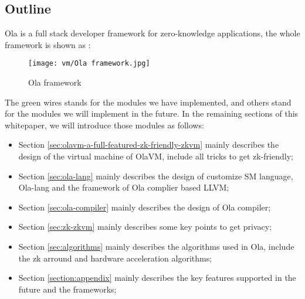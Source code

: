 \subsection{Outline}

Ola is a full stack developer framework for zero-knowledge applications, the whole framework is shown as :
\begin{figure}[!ht]
    \centering
    \texttt{[image: vm/Ola framework.jpg]}
    \caption{Ola framework}
    \label{fig:Ola framework}
\end{figure}

The green wires stands for the modules we have implemented, and others stand for the modules we will implement in the future. In the remaining sections of this whitepaper, we will introduce those modules 
as follows:
\begin{itemize}
    \item Section \ref{sec:olavm-a-full-featured-zk-friendly-zkvm} mainly describes the design of the virtual machine of OlaVM, include all tricks to get zk-friendly;
    \item Section \ref{sec:ola-lang} mainly describes the design of customize SM language, Ola-lang and the framework of Ola complier based LLVM;
    \item Section \ref{sec:ola-compiler} mainly describes the design of Ola compiler;
    \item Section \ref{sec:zk-zkvm} mainly describes some key points to get privacy;
    \item Section \ref{sec:algorithms} mainly describes the algorithms used in Ola, include the zk arround and hardware acceleration algorithms;
    \item Section \ref{section:appendix} mainly describes the key features supported in the future and the frameworks;
\end{itemize}
